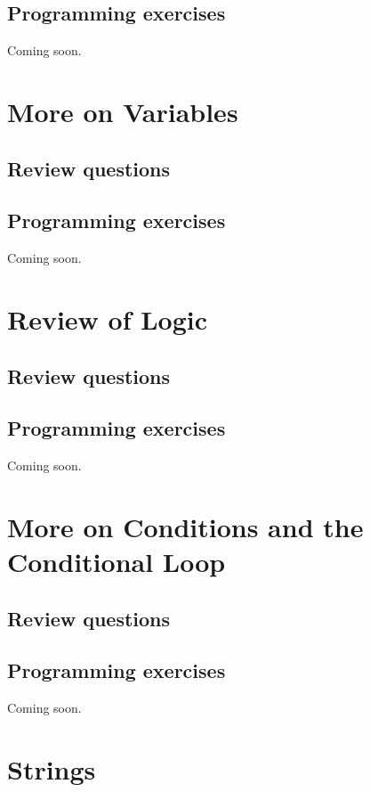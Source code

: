 \documentclass[article,A4,12pt]{llncs}
\begin{document}
\subsection{Programming exercises}

Coming soon.


\section{More on Variables}

\subsection{Review questions}

\subsection{Programming exercises}

Coming soon.


\section{Review of Logic}

\subsection{Review questions}

\subsection{Programming exercises}

Coming soon.


\section{More on Conditions and the Conditional Loop}

\subsection{Review questions}

\subsection{Programming exercises}

Coming soon.


\section{Strings}
\end{document}
